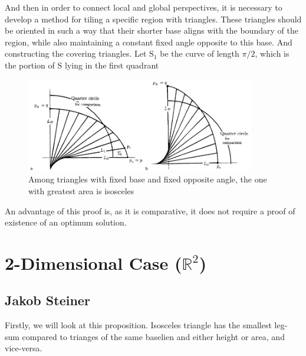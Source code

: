 \documentclass[a4paper]{book}
\numberwithin{theorem}{section}%
\begin{document}
\begin{itemize}
\begin{figure}[hbt!]
\begin{center}
        \end{center}
    \end{figure}\leavevmode
    \newline
    And then in order to connect local and global perspectives, it is necessary to develop a method for tiling a specific region with triangles. These triangles should be oriented in such a way that their shorter base aligns with the boundary of the region, while also maintaining a constant fixed angle opposite to this base.
    \newline
    And constructing the covering triangles. Let $\mathrm{S}_{1}$ be the curve of length $\pi/2$, which is the portion of $\mathrm{S}$ lying in the first quadrant
    \begin{figure}[hbt!]
        \begin{center}   
            \includegraphics[width=100mm]{Lawlor2}
            \caption{Among triangles with fixed base and fixed opposite angle, the one with greatest area is isosceles}
        \end{center}
    \end{figure}\leavevmode
    \newline
    An advantage of this proof is, as it is comparative, it does not require a proof of existence of an optimum solution.~\citep{lawlor1998new}
\end{itemize}

\chapter{2-Dimensional Case ($\mathbb{R}^2$)}
\section{Jakob Steiner}
Firstly, we will look at this proposition. Isosceles triangle has the smallest leg-sum compared to trianges of the same baselien and either height or area, and vice-versa. 
\end{document}
